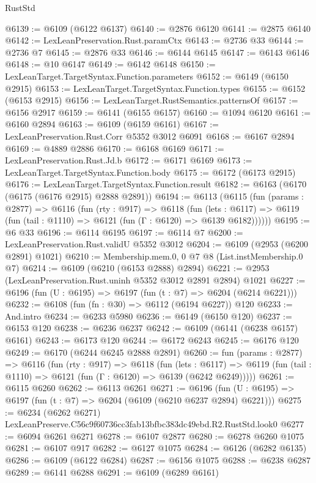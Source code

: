 \begin{lexlean}{RustStd}
\begin{coremodule}
@6139 := @6109 (@6122 @6137)
@6140 := @2876 @6120
@6141 := @2875 @6140
@6142 := LexLeanPreservation.Rust.paramCtx
@6143 := @2736 @33
@6144 := @2736 @7
@6145 := @2876 @33
@6146 := @6144 @6145
@6147 := @6143 @6146
@6148 := @10 @6147
@6149 := @6142 @6148
@6150 := LexLeanTarget.TargetSyntax.Function.parameters
@6152 := @6149 (@6150 @2915)
@6153 := LexLeanTarget.TargetSyntax.Function.types
@6155 := @6152 (@6153 @2915)
@6156 := LexLeanTarget.RustSemantics.patternsOf
@6157 := @6156 @2917
@6159 := @6141 (@6155 @6157)
@6160 := @1094 @6120
@6161 := @6160 @2894
@6163 := @6109 (@6159 @6161)
@6167 := LexLeanPreservation.Rust.Corr @5352 @3012 @6091
@6168 := @6167 @2894
@6169 := @4889 @2886
@6170 := @6168 @6169
@6171 := LexLeanPreservation.Rust.Jd.b
@6172 := @6171 @6169
@6173 := LexLeanTarget.TargetSyntax.Function.body
@6175 := @6172 (@6173 @2915)
@6176 := LexLeanTarget.TargetSyntax.Function.result
@6182 := @6163 (@6170 (@6175 (@6176 @2915) @2888 @2891))
@6194 := @6113
    (@6115
      (fun (params : @2877) =>
      @6116
        (fun (rty : @917) =>
        @6118
          (fun (lets : @6117) =>
          @6119 (fun (tail : @1110) => @6121 (fun (Γ : @6120) => @6139 @6182))))))
@6195 := @6 @33
@6196 := @6114 @6195
@6197 := @6114 @7
@6200 := LexLeanPreservation.Rust.validU @5352 @3012
@6204 := @6109 (@2953 (@6200 @2891) @1021)
@6210 := Membership.mem.{0, 0} @7 @8 (List.instMembership.{0} @7)
@6214 := @6109 (@6210 (@6153 @2888) @2894)
@6221 := @2953 (LexLeanPreservation.Rust.uninh @5352 @3012 @2891 @2894) @1021
@6227 := @6196 (fun (U : @6195) => @6197 (fun (t : @7) => @6204 (@6214 @6221)))
@6232 := @6108 (fun (fn : @30) => @6112 (@6194 @6227)) @120
@6233 := And.intro
@6234 := @6233 @5980
@6236 := @6149 (@6150 @120)
@6237 := @6153 @120
@6238 := @6236 @6237
@6242 := @6109 (@6141 (@6238 @6157) @6161)
@6243 := @6173 @120
@6244 := @6172 @6243
@6245 := @6176 @120
@6249 := @6170 (@6244 @6245 @2888 @2891)
@6260 := fun (params : @2877) =>
  @6116
    (fun (rty : @917) =>
    @6118
      (fun (lets : @6117) =>
      @6119 (fun (tail : @1110) => @6121 (fun (Γ : @6120) => @6139 (@6242 @6249)))))
@6261 := @6115 @6260
@6262 := @6113 @6261
@6271 := @6196 (fun (U : @6195) => @6197 (fun (t : @7) => @6204 (@6109 (@6210 @6237 @2894) @6221)))
@6275 := @6234 (@6262 @6271) LexLeanPreserve.C56c9f60736cc3fab13bfbc383dc49ebd.R2.RustStd.look0
@6277 := @6094 @6261 @6271
@6278 := @6107 @2877
@6280 := @6278 @6260 @1075
@6281 := @6107 @917
@6282 := @6127 @1075
@6284 := @6126 (@6282 @6135)
@6286 := @6109 (@6122 @6284)
@6287 := @6156 @1075
@6288 := @6238 @6287
@6289 := @6141 @6288
@6291 := @6109 (@6289 @6161)

\end{coremodule}
\end{lexlean}
